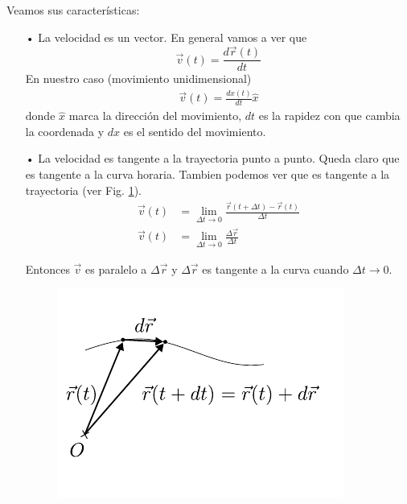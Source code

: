 \para
Veamos sus características: 
\begin{itemize}[noitemsep]
  \item [•]La velocidad es un vector. En general vamos a ver que
  \begin{equation*}
    \vec{v}(t)=\frac{d\vec{r}(t)}{dt}
  \end{equation*}
  En nuestro caso (movimiento unidimensional)
  \begin{align*}
    \vec{v}(t)=\frac{dx(t)}{dt}\hat{x} 
  \end{align*}
  donde $\hat{x}$ marca la dirección del movimiento, $dt$ es la rapidez con que cambia la coordenada y $dx$ es el 
  sentido del movimiento.
  \item [•] La velocidad es tangente a la trayectoria punto a punto. Queda claro que es tangente a la curva horaria.
  Tambien podemos ver que es tangente a la trayectoria (ver Fig. \ref{fig:1-7}).
  \begin{align*}
    \vec{v}(t)&=\lim\limits_{\Delta t\rightarrow 0}\frac{\vec{r}(t+\Delta t)-\vec{r}(t)}{\Delta t} \\
    \vec{v}(t)&=\lim\limits_{\Delta t\rightarrow 0}\frac{\Delta\vec{r}}{\Delta t}
  \end{align*}

  Entonces $\vec{v}$ es paralelo a $\Delta \vec{r}$ y $\Delta\vec{r}$ es tangente a la 
  curva cuando $\Delta t\rightarrow 0$.
  \begin{figure}[htbp]
    \centering
    \includegraphics[]{images/f1-7.pdf}
    \caption{}
    \label{fig:1-7}
  \end{figure}
\end{itemize}

